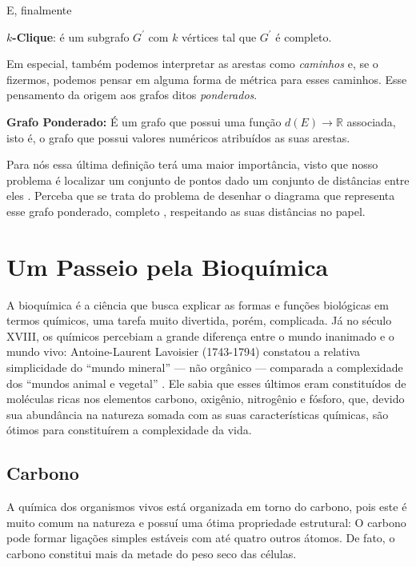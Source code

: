 \documentclass[a4paper,12pt]{article}
\begin{document}
	E, finalmente
	\begin{center}
		\begin{minipage}{0.9 \linewidth}
			\textbf{$k$-Clique}: é um subgrafo $G^\prime$ com $k$ vértices tal que $G^\prime$ é completo.
		\end{minipage}
	\end{center}
	
	Em especial, também podemos interpretar as arestas como \textit{caminhos} e, se o fizermos, podemos pensar em alguma forma de métrica para esses caminhos. Esse pensamento da origem aos grafos ditos \textit{ponderados}.
	
	
	\begin{center}
		\begin{minipage}{0.9 \linewidth}
			\textbf{Grafo Ponderado:} É um grafo que possui uma função $d(E) \rightarrow \mathbb{R}$ associada, isto é, o grafo que possui valores numéricos atribuídos as suas arestas.
		\end{minipage}
	\end{center}

	Para nós essa última definição terá uma maior importância, visto que nosso problema é localizar um conjunto de pontos dado um conjunto de distâncias entre eles \cite{fidalgotese}. Perceba que se trata do problema de desenhar o diagrama que representa esse grafo ponderado, completo \cite{carlileBook31Coloquio}, respeitando as suas distâncias no papel.
	
	\newpage
	
	\section{Um Passeio pela Bioquímica}
	A bioquímica é a ciência que busca explicar as formas e funções biológicas em termos químicos, uma tarefa muito divertida, porém, complicada. Já no século XVIII, os químicos percebiam a grande diferença entre o mundo inanimado e o mundo vivo: Antoine-Laurent Lavoisier (1743-1794) constatou a relativa simplicidade do ``mundo mineral'' --- não orgânico --- comparada a complexidade dos ``mundos animal e vegetal'' \cite{bioquimicaLehninger}. Ele sabia que esses últimos eram constituídos de moléculas ricas nos elementos carbono, oxigênio, nitrogênio e fósforo, que, devido sua abundância na natureza somada com as suas características químicas, são ótimos para constituírem a complexidade da vida.

	\subsection{Carbono}
	A química dos organismos vivos está organizada em torno do carbono, pois este é muito comum na natureza e possuí uma ótima propriedade estrutural: O carbono pode formar ligações simples estáveis com até quatro outros átomos. De fato, o carbono constitui mais da metade do peso seco das células. 
	
\end{document}
